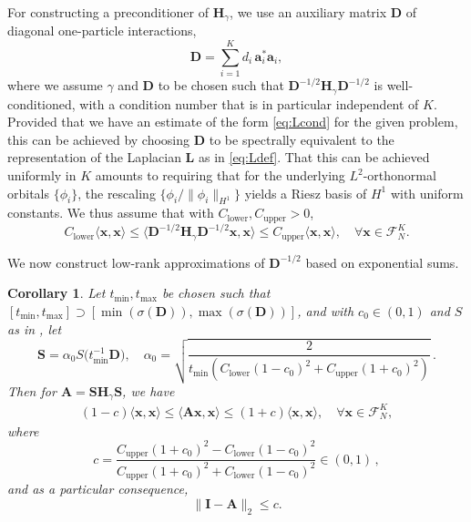 \documentclass[a4paper,11pt,oneside]{amsart}
\providecommand{\norm}[1]{\lVert#1\rVert}
\newtheorem{cor}[theorem]{Corollary}
\theoremstyle{definition}
\theoremstyle{remark}
\newcommand{\cF}{{\mathcal{F}}}
\newcommand{\A}{\ten A}
\newcommand{\ten}[1]{\boldsymbol{#1}}
\numberwithin{equation}{section}
\numberwithin{theorem}{section}
\begin{document}
%

For constructing a preconditioner of $\ten H_\gamma$, we use an auxiliary matrix $ \ten D$ of diagonal one-particle interactions,
\[ \ten D = \sum_{i = 1}^K d_{i}\, \ten a_i^\ast \ten a_i,\]
where we assume $\gamma$ and $\ten D$ to be chosen such that $\ten D^{-1/2} \ten H_\gamma \ten D^{-1/2}$ is well-conditioned, with a condition number that is in particular independent of $K$. Provided that we have an estimate of the form \eqref{eq:Lcond} for the given problem, this can be achieved by choosing $\ten D$ to be spectrally equivalent to the representation of the Laplacian $\ten L$ as in \eqref{eq:Ldef}. That this can be achieved uniformly in $K$ amounts to requiring that for the underlying $L^2$-orthonormal orbitals $\{ \phi_i \}$, the rescaling $\{ \phi_i  / \norm{\phi_i}_{H^1} \}$ yields a Riesz basis of $H^1$ with uniform constants.
We thus assume that with $C_{\mathrm{lower}} , C_{\mathrm{upper}} > 0$, 
\begin{equation}\label{eq:lowerupper}
  C_{\mathrm{lower}} \langle   \ten x,  \ten x \rangle
   \leq \langle \ten D^{-1/2} \ten H_\gamma \ten D^{-1/2}  \ten x , \ten x \rangle 	\leq 
   C_{\mathrm{upper}} \langle  \ten x,  \ten x \rangle, \quad \forall \ten x \in \cF^{K}_N.
\end{equation}

We now construct low-rank approximations of $\ten D^{-1/2}$ based on exponential sums.

\begin{cor}\label{cor:lrprecond}
Let $t_{\min}, t_{\max}$ be chosen such that $[  t_{\min},  t_{\max} ] \supset [\min(\sigma(\ten D)) ,  \max(\sigma(\ten D))]$, and with $c_0 \in (0,1)$ and $S$ as in , let
\begin{equation}\label{eq:Sdef}
  \ten S =  \alpha_0 S \bigl( t_{\min}^{-1} \ten D \bigr) , \quad \alpha_0 = \sqrt{\frac{2}{ t_{\min} (C_{\mathrm{lower}} ( 1 - c_0)^2 + C_{\mathrm{upper}}( 1 + c_0)^2)}}\,.
\end{equation}
Then for $\A = \ten S \ten H_\gamma \ten S$, we have
\begin{align}\label{specequivA}
  (1-c) \langle   \ten x,  \ten x \rangle
   \leq \langle \A  \ten x , \ten x \rangle 	\leq 
   (1 + c) \langle  \ten x,  \ten x \rangle, \quad \forall \ten x \in \mathcal{F}_N^K ,
\end{align}
where 
\begin{equation}\label{eq:precondcdef}
   c = \frac{C_{\mathrm{upper}}(1+c_0)^2 - C_{\mathrm{lower}}(1-c_0)^2}{C_{\mathrm{upper}}(1+c_0)^2 + C_{\mathrm{lower}}(1-c_0)^2}  \in (0,1) \,,
\end{equation}
and as a particular consequence,
\begin{equation}\label{rhockappa}
\norm{ \ten I - \A }_2 \leq c.
\end{equation}
\end{cor}
\end{document}
